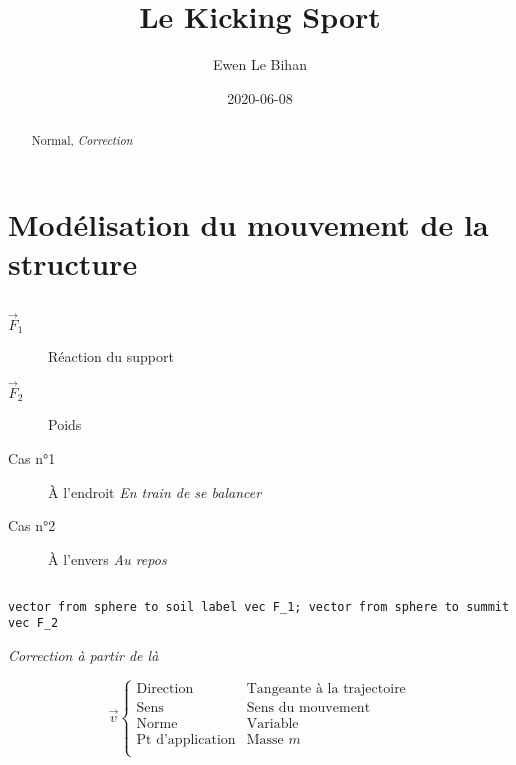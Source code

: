 \documentclass{article}
\title{Le Kicking Sport}
\date{2020-06-08}
\author{Ewen Le Bihan}
\begin{document}
\begin{abstract}
	Normal, \emph{Correction} 
\end{abstract}

\maketitle

\section{Modélisation du mouvement de la structure}
\subsection{}
\begin{description}
	\item[$\vec F_1$] Réaction du support
	\item[$\vec F_2$] Poids
\end{description}

\begin{description}
	\item[Cas n°1] À l'endroit \emph{En train de se balancer} 
	\item[Cas n°2] À l'envers \emph{Au repos} 
\end{description}

\subsection{}
\texttt{vector from sphere to soil label vec F\_1; vector from sphere to summit vec F\_2}

\emph{Correction à partir de là} 

\[
 \vec v \begin{cases}
		 \text{Direction} & \text{Tangeante à la trajectoire} \\
		 \text{Sens} & \text{Sens du mouvement} \\
		 \text{Norme} & \text{Variable} \\
		 \text{Pt d'application} & \text{Masse }m \\
	 \end{cases}
\] 

\subsection{}
\subsubsection{}
\end{document}
